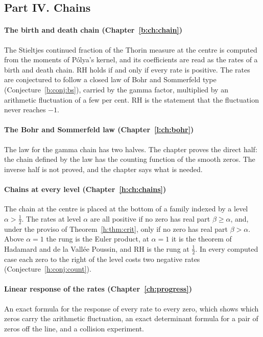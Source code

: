 \subsection*{Part IV. Chains}

\paragraph{The birth and death chain (Chapter~\ref{b:ch:chain})} The Stieltjes continued fraction of the Thorin measure at the centre is computed from the moments of P\'olya's kernel, and its coefficients are read as the rates of a birth and death chain. RH holds if and only if every rate is positive. The rates are conjectured to follow a closed law of Bohr and Sommerfeld type (Conjecture~\ref{b:conj:bs}), carried by the gamma factor, multiplied by an arithmetic fluctuation of a few per cent. RH is the statement that the fluctuation never reaches $-1$.

\paragraph{The Bohr and Sommerfeld law (Chapter~\ref{l:ch:bohr})} The law for the gamma chain has two halves. The chapter proves the direct half: the chain defined by the law has the counting function of the smooth zeros. The inverse half is not proved, and the chapter says what is needed.

\paragraph{Chains at every level (Chapter~\ref{h:ch:chains})} The chain at the centre is placed at the bottom of a family indexed by a level $\alpha>\frac12$. The rates at level $\alpha$ are all positive if no zero has real part $\beta\ge\alpha$, and, under the proviso of Theorem~\ref{h:thm:crit}, only if no zero has real part $\beta>\alpha$. Above $\alpha=1$ the rung is the Euler product, at $\alpha=1$ it is the theorem of Hadamard and de la Vall\'ee Poussin, and RH is the rung at $\frac12$. In every computed case each zero to the right of the level costs two negative rates (Conjecture~\ref{h:conj:count}).

\paragraph{Linear response of the rates (Chapter~\ref{ch:progress})} An exact formula for the response of every rate to every zero, which shows which zeros carry the arithmetic fluctuation, an exact determinant formula for a pair of zeros off the line, and a collision experiment.

